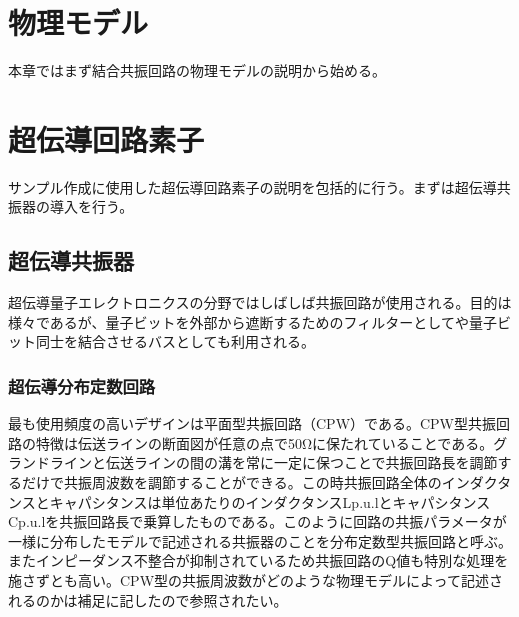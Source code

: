 \section{物理モデル}
    本章ではまず結合共振回路の物理モデルの説明から始める。
\section{超伝導回路素子}
    サンプル作成に使用した超伝導回路素子の説明を包括的に行う。まずは超伝導共振器の導入を行う。
    \subsection{超伝導共振器}
        超伝導量子エレクトロニクスの分野ではしばしば共振回路が使用される。目的は様々であるが、量子ビットを外部から遮断するためのフィルターとしてや量子ビット同士を結合させるバスとしても利用される。
        \subsubsection{超伝導分布定数回路}
            最も使用頻度の高いデザインは平面型共振回路（CPW）である。CPW型共振回路の特徴は伝送ラインの断面図が任意の点で50Ωに保たれていることである。グランドラインと伝送ラインの間の溝を常に一定に保つことで共振回路長を調節するだけで共振周波数を調節することができる。この時共振回路全体のインダクタンスとキャパシタンスは単位あたりのインダクタンスLp.u.lとキャパシタンスCp.u.lを共振回路長で乗算したものである。このように回路の共振パラメータが一様に分布したモデルで記述される共振器のことを分布定数型共振回路と呼ぶ。またインピーダンス不整合が抑制されているため共振回路のQ値も特別な処理を施さずとも高い。CPW型の共振周波数がどのような物理モデルによって記述されるのかは補足に記したので参照されたい。
